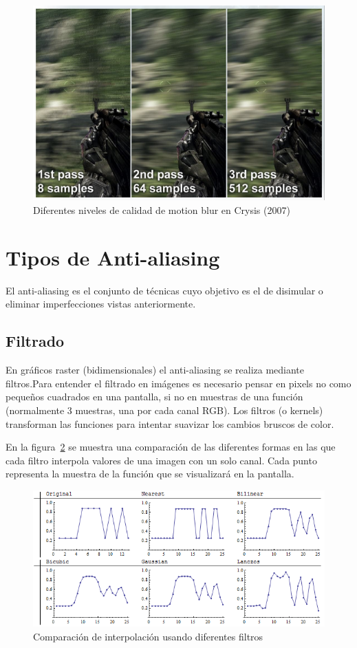 \documentclass[withindex, glossary]{cam-thesis}
\begin{document}
\begin{figure}[!htbp]
    \includegraphics[width=.8\linewidth]{figures/blurringquality.png}
    \caption{Diferentes niveles de calidad de motion blur en Crysis (2007)\cite{crysis}}
    \label{blurringquality}
\end{figure}


\section{Tipos de Anti-aliasing}

El anti-aliasing es el conjunto de técnicas cuyo objetivo es el de disimular o eliminar imperfecciones vistas anteriormente.

\subsection{Filtrado}
\label{filtros}

En gráficos raster (bidimensionales) el anti-aliasing se realiza mediante filtros.Para entender el filtrado en imágenes es necesario pensar en pixels no como pequeños cuadrados en una pantalla, si no en muestras de una función (normalmente 3 muestras, una por cada canal RGB)\cite{Smith95apixel}. Los filtros (o kernels) transforman las funciones para intentar suavizar los cambios bruscos de color.

En la figura~\ref{gls} se muestra una comparación de las diferentes formas en las que cada filtro interpola valores de una imagen con un solo canal. Cada punto representa la muestra de la función que se visualizará en la pantalla.


\begin{figure}[!htbp]
    \includegraphics[width=\linewidth]{figures/Lw6ei.png}
    \caption{Comparación de interpolación usando diferentes filtros\cite{gis}}
    \label{gls}
\end{figure}
\end{document}
